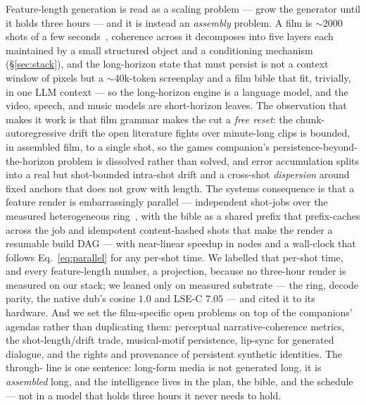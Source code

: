 \documentclass[11pt]{article}
\begin{document}
Feature-length generation is read as a scaling problem --- grow the generator until it holds three hours --- and
it is instead an \emph{assembly} problem. A film is $\sim$2000 shots of a few seconds~\cite{cutting}, coherence
across it decomposes into five layers each maintained by a small structured object and a conditioning mechanism
(\S\ref{sec:stack}), and the long-horizon state that must persist is not a context window of pixels but a
$\sim$40k-token screenplay and a film bible that fit, trivially, in one LLM context --- so the long-horizon engine
is a language model, and the video, speech, and music models are short-horizon leaves. The observation that makes
it work is that film grammar makes the cut a \emph{free reset}: the chunk-autoregressive drift the open literature
fights over minute-long clips is bounded, in assembled film, to a single shot, so the games companion's
persistence-beyond-the-horizon problem is dissolved rather than solved, and error accumulation splits into a real
but shot-bounded intra-shot drift and a cross-shot \emph{dispersion} around fixed anchors that does not grow with
length. The systems consequence is that a feature render is embarrassingly parallel --- independent shot-jobs over
the measured heterogeneous ring~\cite{het}, with the bible as a shared prefix that prefix-caches across the job
and idempotent content-hashed shots that make the render a resumable build DAG --- with near-linear speedup in
nodes and a wall-clock that follows Eq.~\eqref{eq:parallel} for any per-shot time. We labelled that per-shot time,
and every feature-length number, a projection, because no three-hour render is measured on our stack; we leaned
only on measured substrate --- the ring, decode parity, the native dub's cosine $1.0$ and LSE-C $7.05$ --- and
cited it to its hardware. And we set the film-specific open problems on top of the companions' agendas rather than
duplicating them: perceptual narrative-coherence metrics, the shot-length/drift trade, musical-motif persistence,
lip-sync for generated dialogue, and the rights and provenance of persistent synthetic identities. The through-
line is one sentence: long-form media is not generated long, it is \emph{assembled} long, and the intelligence
lives in the plan, the bible, and the schedule --- not in a model that holds three hours it never needs to hold.
\end{document}
